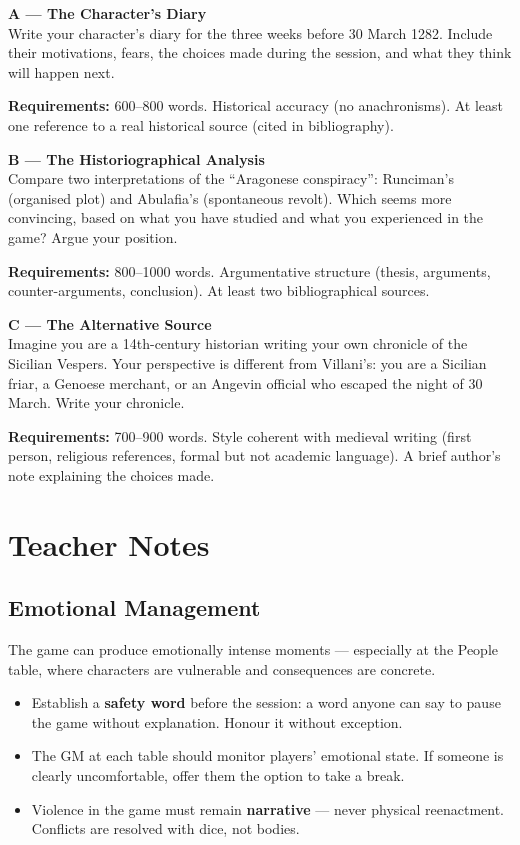 \textbf{A --- The Character's Diary}\\
Write your character's diary for the three weeks before 30 March 1282.
Include their motivations, fears, the choices made during the session,
and what they think will happen next.

\textbf{Requirements:} 600--800 words. Historical accuracy (no
anachronisms). At least one reference to a real historical source
(cited in bibliography).

\filetto

\textbf{B --- The Historiographical Analysis}\\
Compare two interpretations of the ``Aragonese conspiracy'': Runciman's
(organised plot) and Abulafia's (spontaneous revolt). Which seems more
convincing, based on what you have studied and what you experienced in
the game? Argue your position.

\textbf{Requirements:} 800--1000 words. Argumentative structure (thesis,
arguments, counter-arguments, conclusion). At least two bibliographical
sources.

\filetto

\textbf{C --- The Alternative Source}\\
Imagine you are a 14th-century historian writing your own chronicle of
the Sicilian Vespers. Your perspective is different from Villani's: you
are a Sicilian friar, a Genoese merchant, or an Angevin official who
escaped the night of 30 March. Write your chronicle.

\textbf{Requirements:} 700--900 words. Style coherent with medieval
writing (first person, religious references, formal but not academic
language). A brief author's note explaining the choices made.

\secsep

\section{Teacher Notes}

\subsection{Emotional Management}

The game can produce emotionally intense moments --- especially at the
People table, where characters are vulnerable and consequences are
concrete.

\begin{itemize}
  \item Establish a \textbf{safety word} before the session: a word
    anyone can say to pause the game without explanation. Honour it
    without exception.
  \item The GM at each table should monitor players' emotional state.
    If someone is clearly uncomfortable, offer them the option to take
    a break.
  \item Violence in the game must remain \textbf{narrative} --- never
    physical reenactment. Conflicts are resolved with dice, not bodies.
\end{itemize}

